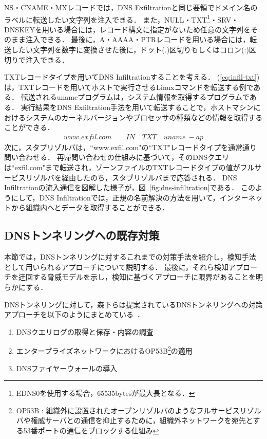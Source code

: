 
NS・CNAME・MXレコードでは，DNS Exfiltrationと同じ要領でドメイン名のラベルに転送したい文字列を注入できる．
また，NULL・TXT\footnote{EDNS0を使用する場合，65535bytesが最大長となる．}・SRV・DNSKEYを用いる場合には，レコード構文に指定がないため任意の文字列をそのまま注入できる．
最後に，A・AAAA・PTRレコードを用いる場合には，転送したい文字列を数字に変換させた後に，ドット(.)区切りもしくはコロン(:)区切りで注入できる．

TXTレコードタイプを用いてDNS Infiltrationすることを考える．
(\ref{eq:infil-txt})は，TXTレコードを用いてホストで実行させるLinuxコマンドを転送する例である．
転送されるunameプログラムは，システム情報を取得するプログラムである．
実行結果をDNS Exfiltration手法を用いて転送することで，ホストマシンにおけるシステムのカーネルバージョンやプロセッサの種類などの情報を取得することができる．
\begin{eqnarray}
 www.exfil.com \qquad IN \quad TXT \quad uname \ -ap
 \label{eq:infil-txt}
\end{eqnarray}
次に，スタブリゾルバは，``www.exfil.com"の``TXT"レコードタイプを通常通り問い合わせる．
再帰問い合わせの仕組みに基づいて，そのDNSクエリは``exfil.com"まで転送され，ゾーンファイルのTXTレコードタイプの値がフルサービスリゾルバを経由したのち，スタブリゾルバまで応答される．
DNS Infiltrationの流入通信を図解した様子が，図~\ref{fig:dns-infiltration}である．
このようにして，DNS Infiltrationでは，正規の名前解決の方法を用いて，インターネットから組織内へとデータを取得することができる．


\newpage
\subsection{DNSトンネリングへの既存対策}

本節では，DNSトンネリングに対するこれまでの対策手法を紹介し，検知手法として用いられるアプローチについて説明する．
最後に，それら検知アプローチを迂回する脅威モデルを示し，検知に基づくアプローチに限界があることを明らかにする．

DNSトンネリングに対して，森下らは提案されているDNSトンネリングへの対策アプローチを以下のようにまとめている~\cite{morishita}．
\begin{enumerate}
 \item DNSクエリログの取得と保存・内容の調査
 \item エンタープライズネットワークにおけるOP53B\footnote{OP53B : 組織外に設置されたオープンリゾルバのようなフルサービスリゾルバや権威サーバとの通信を抑止するために，組織外ネットワークを宛先とする53番ポートの通信をブロックする仕組み}の適用
 \item DNSファイヤーウォールの導入
\end{enumerate}

